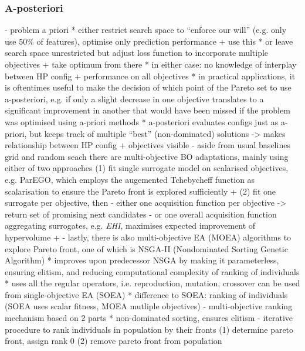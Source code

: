 \documentclass[twoside,11pt]{article}
\begin{document}
\subsubsection{A-posteriori}
\label{sec-moo-post}
- problem a priori
  * either restrict search space to ``enforce our will'' (e.g. only use 50\% of features), optimise only prediction performance + use this
  * or leave search space unrestricted but adjust loss function to incorporate multiple objectives + take optimum from there
  * in either case: no knowledge of interplay between HP config + performance on all objectives
  * in practical applications, it is oftentimes useful to make the decision of which point of the Pareto set to use a-posteriori, e.g. if only a slight decrease in
    one objective translates to a significant improvement in another that would have been missed if the problem was optimised using a-priori methods
  * a-posteriori evaluates configs just as a-priori, but keeps track of multiple ``best'' (non-dominated) solutions -> makes relationship between HP config + objectives visible
- aside from usual baselines grid and random seach there are multi-objective BO adaptations, mainly using either of two approaches
  (1) fit single surrogate model on scalarised objectives, e.g. ParEGO, which employs the augemented Tchebycheff function as scalarisation to ensure the Pareto front is
      explored sufficiently \citep[pp. 15f]{10.1145/3610536} + \citep[pp. 54-56]{ParEGO}
  (2) fit one surrogate per objective, then
    - either one acquisition function per objective -> return set of promising next candidates
    - or one overall acquisition function aggregating surrogates, e.g. \textit{EHI}, maximises expected improvement of hypervolume \citep[p. 16]{10.1145/3610536} + \citep[pp. 8f]{EHI}
- lastly, there is also multi-objective EA (MOEA) algorithms to explore Pareto front, one of which is NSGA-II (Nondominated Sorting Genetic Algorithm)
  * improves upon predecessor NSGA \citep{NSGA} by making it parameterless, ensuring elitism, and reducing computational complexity of ranking of individuals \citep[p. 182]{NSGA_II}
  * uses all the regular operators, i.e. reproduction, mutation, crossover can be used from single-objective EA (SOEA)
  * difference to SOEA: ranking of individuals (SOEA uses scalar fitness, MOEA mutliple objectives)
    - multi-objective ranking mechanism based on 2 parts
      * non-dominated sorting, ensures elitism
        - iterative procedure to rank individuals in population by their fronts
        (1) determine pareto front, assign rank 0
        (2) remove pareto front from population
\end{document}
